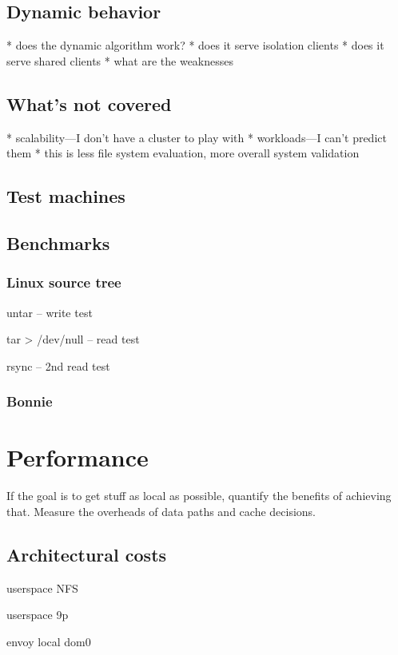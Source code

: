 \subsection{Dynamic behavior}
* does the dynamic algorithm work?
* does it serve isolation clients
* does it serve shared clients
* what are the weaknesses

\subsection{What's not covered}
* scalability---I don't have a cluster to play with
* workloads---I can't predict them
* this is less file system evaluation, more overall system validation

\subsection{Test machines}

\subsection{Benchmarks}

\subsubsection{Linux source tree}
untar -- write test

tar > /dev/null -- read test

rsync -- 2nd read test

\subsubsection{Bonnie}

\section{Performance}

If the goal is to get stuff as local as possible, quantify the benefits of achieving that. Measure the overheads of data paths and cache decisions.

\subsection{Architectural costs}

userspace NFS

userspace 9p

envoy local dom0

